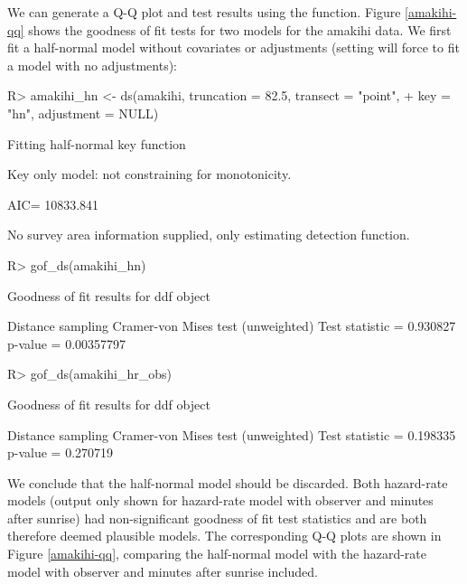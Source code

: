 \documentclass[article]{jss}\usepackage[]{graphicx}\usepackage[]{color}
\begin{document}
We can generate a Q-Q plot and test results using the  function. Figure \ref{amakihi-qq} shows the goodness of fit tests for two models for the amakihi data. We first fit a half-normal model without covariates or adjustments (setting  will force  to fit a model with no adjustments):
\begin{Schunk}
\begin{Sinput}
R> amakihi_hn <- ds(amakihi, truncation = 82.5, transect = "point",
+                  key = "hn", adjustment = NULL)
\end{Sinput}
\begin{Soutput}
Fitting half-normal key function
\end{Soutput}
\begin{Soutput}
Key only model: not constraining for monotonicity.
\end{Soutput}
\begin{Soutput}
AIC= 10833.841
\end{Soutput}
\begin{Soutput}
No survey area information supplied, only estimating detection function.
\end{Soutput}
\begin{Sinput}
R> gof_ds(amakihi_hn)
\end{Sinput}
\begin{Soutput}

Goodness of fit results for ddf object

Distance sampling Cramer-von Mises test (unweighted)
Test statistic = 0.930827 p-value = 0.00357797
\end{Soutput}
\begin{Sinput}
R> gof_ds(amakihi_hr_obs)
\end{Sinput}
\begin{Soutput}

Goodness of fit results for ddf object

Distance sampling Cramer-von Mises test (unweighted)
Test statistic = 0.198335 p-value = 0.270719
\end{Soutput}
\end{Schunk}
We conclude that the half-normal model should be discarded. Both hazard-rate models (output only shown for hazard-rate model with observer and minutes after sunrise) had non-significant goodness of fit test statistics and are both therefore deemed plausible models. The corresponding Q-Q plots are shown in Figure \ref{amakihi-qq}, comparing the half-normal model with the hazard-rate model with observer and minutes after sunrise included.
\end{document}
